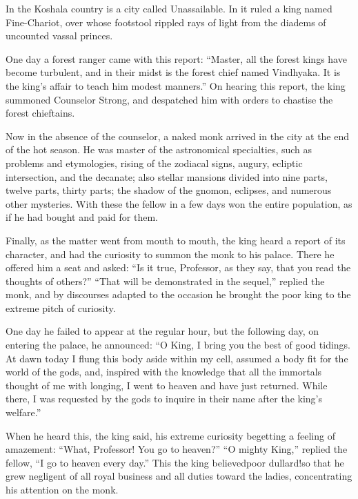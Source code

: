 \documentclass[article, twoside, 14pt]{memoir}
\begin{document}
\label{s25}

In the Koshala country is a city called Unassailable. In it ruled a
king named Fine-Chariot, over whose footstool rippled rays of light
from the diadems of uncounted vassal princes.

One day a forest ranger came with this report:
``Master, all the forest kings have become turbulent, and in their midst is the forest chief named Vindhyaka. It is the king's affair to teach him modest manners.''
On hearing this report, the king summoned Counselor Strong, and
despatched him with orders to chastise the forest chieftains.

Now in the absence of the counselor, a naked monk arrived in the
city at the end of the hot season. He was master of the
astronomical specialties, such as problems and etymologies, rising
of the zodiacal signs, augury, ecliptic intersection, and the
decanate; also stellar mansions divided into nine parts, twelve
parts, thirty parts; the shadow of the gnomon, eclipses, and
numerous other mysteries. With these the fellow in a few days won
the entire population, as if he had bought and paid for them.

Finally, as the matter went from mouth to mouth, the king heard a
report of its character, and had the curiosity to summon the monk
to his palace. There he offered him a seat and asked:
``Is it true, Professor, as they say, that you read the thoughts of others?''
``That will be demonstrated in the sequel,'' replied the monk, and
by discourses adapted to the occasion he brought the poor king to
the extreme pitch of curiosity.

One day he failed to appear at the regular hour, but the following
day, on entering the palace, he announced:
``O King, I bring you the best of good tidings. At dawn today I flung this body aside within my cell, assumed a body fit for the world of the gods, and, inspired with the knowledge that all the immortals thought of me with longing, I went to heaven and have just returned. While there, I was requested by the gods to inquire in their name after the king's welfare.''

When he heard this, the king said, his extreme curiosity begetting
a feeling of amazement: ``What, Professor! You go to heaven?''
``O mighty King,'' replied the fellow,
``I go to heaven every day.'' This the king believed{\textemdash}poor
dullard!{\textemdash}so that he grew negligent of all royal business and all
duties toward the ladies, concentrating his attention on the monk.
\end{document}
